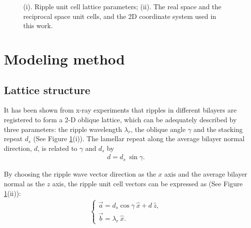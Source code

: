 \begin{figure}
\centerline {}
\vspace{11pt}
\caption{(i). Ripple unit cell lattice parameters; (ii). The real space and
the reciprocal space unit cells, and the 2D coordinate system used in this 
work.
\label{unitcells}}
\end{figure}

\section{Modeling method}
\label{rppl_theory}


\subsection{Lattice structure}
\label{rppl_theory_1}

It has been shown from x-ray experiments \cite{Tar73,JanSS79,Ino80,Ale85,%
Wac89a,Kat95} that ripples in different bilayers are registered to form a 
2-D oblique lattice, which can be adequately described by three parameters: 
the ripple wavelength $\lambda_r$, the oblique angle $\gamma$ and the stacking
repeat $d_s$ (See Figure \ref{unitcells}(i)). The lamellar repeat along 
the average bilayer
normal direction, $d$, is related to $\gamma$ and $d_s$ by
\begin{eqnarray}
\label{dspace}
d = d_s\ \sin \gamma.
\end{eqnarray}

By choosing the ripple wave vector direction as the $x$ axis and the average
bilayer normal as the $z$ axis, the ripple unit cell vectors can be 
expressed as (See Figure \ref{unitcells}(ii)):
\begin{eqnarray}
\label{realunit}
\left\{ \begin{array}{ll}
\vec{a} = d_s \cos \gamma\ \hat{x} + d\ \hat{z},\\
\vec{b} = \lambda_r\ \hat{x}.
\end{array}
\right.
\end{eqnarray}

